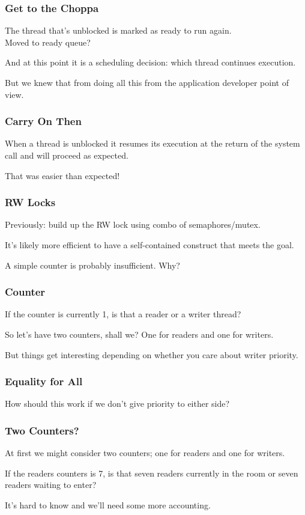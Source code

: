 \begin{frame}
\frametitle{Get to the Choppa}

The thread that's unblocked is marked as ready to run again.\\
\quad Moved to ready queue?

And at this point it is a scheduling decision: which thread continues execution. 

But we knew that from doing all this from the application developer point of view.

\end{frame}

\begin{frame}
\frametitle{Carry On Then}

When a thread is unblocked it resumes its execution at the return of the system call and will proceed as expected.

That was easier than expected!

\end{frame}

\begin{frame}
\frametitle{RW Locks}

Previously: build up the RW lock using combo of semaphores/mutex.


It's likely more efficient to have a self-contained construct that meets the goal.

A simple counter is probably insufficient. Why?

\end{frame}

\begin{frame}
\frametitle{Counter}

If the counter is currently 1, is that a reader or a writer thread?

So let's have two counters, shall we? One for readers and one for writers.

But things get interesting depending on whether you care about writer priority.

\end{frame}

\begin{frame}
\frametitle{Equality for All}

How should this work if we don't give priority to either side?

\end{frame}

\begin{frame}
\frametitle{Two Counters?}

At first we might consider two counters; one for readers and one for writers. 

If the readers counters is 7, is that seven readers currently in the room or seven readers waiting to enter? 

It's hard to know and we'll need some more accounting.

\end{frame}

